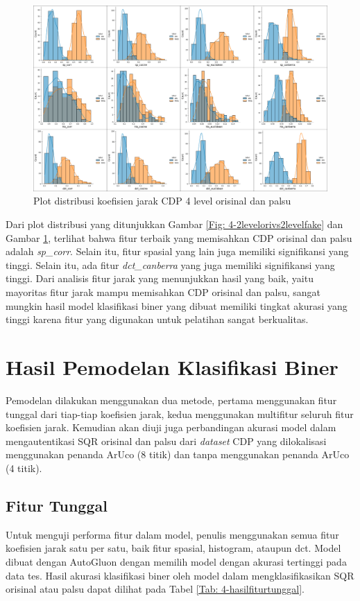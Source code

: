 \begin{figure}[!h]
	\centering
	\includegraphics[width=\textwidth]{contents/chapter-4/4-4levelorivs4levelfake.png}
	\caption{Plot distribusi koefisien jarak CDP 4 level orisinal dan palsu}
	\label{Fig: 4-4levelorivs4levelfake}
\end{figure}

Dari plot distribusi yang ditunjukkan Gambar \ref{Fig: 4-2levelorivs2levelfake} dan Gambar \ref{Fig: 4-4levelorivs4levelfake}, terlihat bahwa fitur terbaik
yang memisahkan CDP orisinal dan palsu adalah \emph{sp\_corr}. Selain itu, fitur spasial yang lain juga memiliki signifikansi yang tinggi. Selain itu, ada
fitur \emph{dct\_canberra} yang juga memiliki signifikansi yang tinggi. Dari analisis fitur jarak yang menunjukkan hasil yang baik, yaitu mayoritas fitur jarak
mampu memisahkan CDP orisinal dan palsu, sangat mungkin hasil model klasifikasi biner yang dibuat memiliki tingkat akurasi yang tinggi karena fitur yang
digunakan untuk pelatihan sangat berkualitas.

\section{Hasil Pemodelan Klasifikasi Biner}
Pemodelan dilakukan menggunakan dua metode, pertama menggunakan fitur tunggal dari tiap-tiap koefisien jarak, kedua menggunakan multifitur seluruh fitur
koefisien jarak. Kemudian akan diuji juga perbandingan akurasi model dalam mengautentikasi SQR orisinal dan palsu dari \emph{dataset} CDP yang dilokalisasi
menggunakan penanda ArUco (8 titik) dan tanpa menggunakan penanda ArUco (4 titik).
\subsection{Fitur Tunggal}
Untuk menguji performa fitur dalam model, penulis menggunakan semua fitur koefisien jarak satu per satu, baik fitur spasial, histogram, ataupun dct. Model
dibuat dengan AutoGluon dengan memilih model dengan akurasi tertinggi pada data tes. Hasil akurasi klasifikasi biner oleh model dalam mengklasifikasikan SQR
orisinal atau palsu dapat dilihat pada Tabel \ref{Tab: 4-hasilfiturtunggal}.

